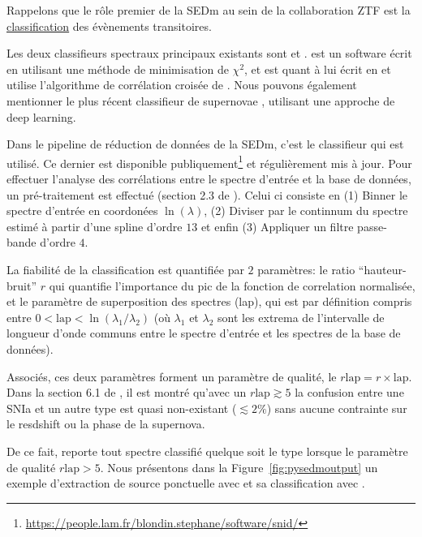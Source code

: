 \documentclass[../main/main.tex]{subfiles}
\begin{document}
Rappelons que le rôle premier de la SEDm au sein de la collaboration ZTF
est la \underline{classification} des évènements transitoires. 

Les deux classifieurs spectraux principaux existants sont 
\citep{HowellSuperfit} et  \citep{BlondinSNID}. 
est un software écrit en  utilisant une méthode de
minimisation de $\chi^{2}$, et  est quant à lui écrit
en  et utilise l'algorithme de corrélation croisée de \citet{TonryDavis}.
Nous pouvons également mentionner le plus récent classifieur de
supernovae  \citep{MuthukrishnaDash}, utilisant une approche de deep learning.

Dans le pipeline de réduction de données de la SEDm, c'est le
classifieur  qui est utilisé. Ce dernier est disponible publiquement\footnote{\url{https://people.lam.fr/blondin.stephane/software/snid/}} et
régulièrement mis à jour. Pour effectuer l'analyse des corrélations
entre le spectre d'entrée et la base de données, un pré-traitement est
effectué (section 2.3 de \citet{BlondinSNID}). Celui ci consiste en (1) Binner le spectre d'entrée en coordonées
$\ln(\lambda)$, (2) Diviser par le continnum du spectre estimé à partir
d'une spline d'ordre $13$ et enfin (3) Appliquer un filtre passe-bande d'ordre $4$.

La fiabilité de la classification est quantifiée par $2$ paramètres: le
ratio ``hauteur-bruit'' $r$ qui quantifie l'importance du pic de la
fonction de correlation normalisée, et le paramètre de superposition des
spectres (lap), qui est par définition compris entre
$0<\text{lap}<\ln(\lambda_{1}/\lambda_{2})$ (où $\lambda_{1}$ et $\lambda_{2}$
sont les extrema de l'intervalle de longueur d'onde communs entre le
spectre d'entrée et les spectres de la base de données).

Associés, ces deux paramètres forment un paramètre de qualité, le
$r\text{lap}=r\times\text{lap}$. Dans la section 6.1 de
\citet{BlondinSNID}, il est montré qu'avec un $r\text{lap}\gtrsim 5$
la confusion entre une SNIa et un autre type est quasi non-existant
($\lesssim2\%$) sans aucune contrainte sur le resdshift ou la phase de
la supernova.

De ce fait, \pysedm reporte tout spectre classifié quelque soit le type
lorsque le paramètre de qualité $r\text{lap}>5$. Nous présentons dans la
Figure~\ref{fig:pysedmoutput} un exemple d'extraction de source
ponctuelle avec \pysedm et sa classification avec .
\end{document}

